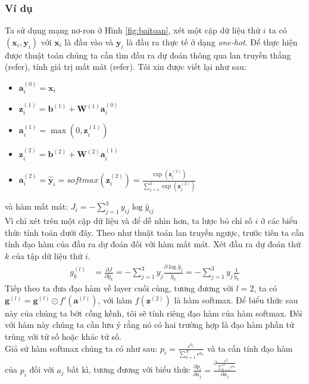 \subsubsection{Ví dụ}
  Ta sử dụng mạng nơ-ron ở Hình \ref{fig:baitoan}, xét một cặp dữ liệu thứ $i$ ta có $(\textbf{x}_i,\textbf{y}_i)$ với $\textbf{x}_{i}$ là đầu vào và $\textbf{y}_i$ là đầu ra thực tế ở dạng \textit{one-hot}. Để thực hiện được thuật toán chúng ta cần tìm đầu ra dự đoán thông qua lan truyền thẳng (refer), tính giá trị mất mát (refer). Tôi xin được viết lại như sau:
\begin{itemize}
	\item[] $\textbf{a}^{(0)}_{i}=\textbf{x}_{i}$
	\item[]  $\textbf{z}^{(1)}_{i}= \textbf{b}^{(1)} + \textbf{W}^{(1)}\textbf{a}^{(0)}_{i}$
	\item[] $\textbf{a}^{(1)}_{i}=\max(0,\textbf{z}^{(1)}_{i})$
	\item[] $\textbf{z}^{(2)}_{i}=\textbf{b}^{(2)} + \textbf{W}^{(2)}\textbf{a}^{(1)}_{i}$	
	\item[] $ \textbf{a}^{(2)}_{i} = \widehat{\textbf{y}}_{i} = softmax(\textbf{z}^{(2)}_i) = \frac{\exp({\textbf{z}^{(2)}_i})}{\sum^{3}_{j=1}{\exp({\textbf{z}^{(2)}_j})}}$
\end{itemize}
và hàm mất mát: $J_i = - \sum_{j=1}^{3}y_{ij}\log\widehat{y}_{ij} $\\
Vì chỉ xét trên một cặp dữ liệu và để dễ nhìn hơn, ta lược bỏ chỉ số $i$ ở các biểu thức tính toán dưới đây. Theo như thuật toán lan truyền ngược, trước tiên ta cần tính đạo hàm của đầu ra dự đoán đối với hàm mất mát. Xét đầu ra dự đoán thứ $k$ của tập dữ liệu thứ $i$.
\begin{equation*}
\begin{split}
g^{(l)}_k & = \frac{\partial J}{\partial \widehat{y}_k}
= -\sum_{j=1}^{3} y_j \frac{\partial \log\widehat{y}_{j}}{\widehat{y}_{k}}
= -\sum_{j=1}^{3} y_j \frac{1}{\widehat{y}_k}
\end{split}
\end{equation*}
Tiếp theo ta đưa đạo hàm về layer cuối cùng, tương đương với $l=2$, ta có $\textbf{g}^{(l)} = \textbf{g}^{(l)} \odot f'(\textbf{a}^{(l)})$, với hàm $f(\textbf{z}^{(2)})$ là hàm softmax. Để biểu thức sau này của chúng ta bớt cồng kềnh, tôi sẽ tính riêng đạo hàm của hàm softmax. Đối với hàm này chúng ta cần lưu ý rằng nó có hai trường hợp là đạo hàm phần tử trùng với tử số hoặc khác tử số.\\
Giả sử hàm softmax chúng ta có như sau: $p_i = \frac{e^{a_i}}{\sum_{k=1}^N e^{a_k}}$ và ta cần tính đạo hàm của $p_i$ đối với $a_j$ bất kì, tương đương với biểu thức $\frac{\partial p_i}{\partial a_j} = \frac{\partial \frac{e^{a_i}}{\sum_{k=1}^N e^{a_k}}}{\partial a_j}$ \\
